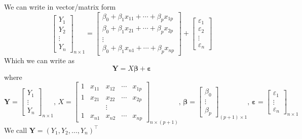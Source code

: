 We can write in vector/matrix form
\[ \begin{bmatrix}
        Y_1    \\
        Y_2    \\
        \vdots \\
        Y_n
    \end{bmatrix}_{n\times 1}=
    \begin{bmatrix}
        \beta_0+\beta_1x_{11}+\cdots+\beta_p x_{1p} \\
        \beta_0+\beta_1x_{21}+\cdots+\beta_p x_{2p} \\
        \vdots                                      \\
        \beta_0+\beta_1x_{n1}+\cdots+\beta_p x_{np}
    \end{bmatrix}+
    \begin{bmatrix}
        \varepsilon_1 \\
        \varepsilon_2 \\
        \vdots        \\
        \varepsilon_n
    \end{bmatrix} \]
Which we can write as
\[ \symbf{Y}=X\symbf{\beta}+\symbf{\varepsilon} \]
where
\[ \symbf{Y}=\begin{bmatrix}
        Y_1    \\
        \vdots \\
        Y_{n}
    \end{bmatrix}_{n\times 1},\,
    X=
    \begin{bmatrix}
        1 & x_{11} & x_{12} & \cdots & x_{1p} \\
        1 & x_{21} & x_{22} & \cdots & x_{2p} \\
          &        & \vdots                   \\
        1 & x_{n1} & x_{n2} & \cdots & x_{np}
    \end{bmatrix}_{n\times(p+1)},\,
    \symbf{\beta}=
    \begin{bmatrix}
        \beta_0 \\
        \vdots  \\
        \beta_p
    \end{bmatrix}_{(p+1)\times 1},\,
    \symbf{\varepsilon}=
    \begin{bmatrix}
        \varepsilon_1 \\
        \vdots        \\
        \varepsilon_n
    \end{bmatrix}_{n\times 1} \]
We call $ \symbf{Y}=(Y_1,Y_2,\ldots,Y_{n})^\top $

